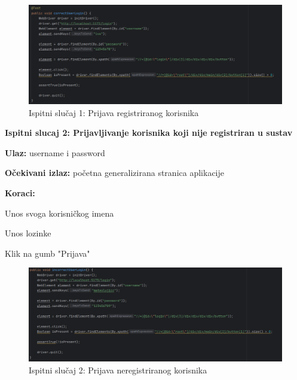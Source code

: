 			
			\begin{figure}[H]
			\includegraphics[scale=0.5]{slike/ispravniUser.PNG} %
			\centering
			\caption{Ispitni slučaj 1: Prijava registriranog korisnika}
			\label{fig:implementacija}
		\end{figure}
		
		\textbf{Ispitni slucaj 2: Prijavljivanje korisnika koji nije registriran u sustav}
			 \begin{packed_item}
				\item \textbf{Ulaz:} username i password
				\item \textbf{Očekivani izlaz:} početna generalizirana stranica aplikacije
				\item \textbf{Koraci:}
						\begin{packed_enum}
							\item Unos svoga korisničkog imena
							\item Unos lozinke
							\item Klik na gumb "Prijava"
						\end{packed_enum}
			\end{packed_item}
			
			
			\begin{figure}[H]
			\includegraphics[scale=0.5]{slike/neispravniUser.PNG} %
			\centering
			\caption{Ispitni slučaj 2: Prijava neregistriranog korisnika}
			\label{fig:implementacija}
		\end{figure}
		
